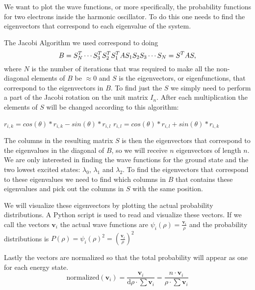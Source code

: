 

We want to plot the wave functions, or more specifically, the
probability functions for two electrons inside the harmonic
oscillator. To do this one needs to find the eigenvectors that
correspond to each eigenvalue of the system.

The Jacobi Algorithm we used correspond to doing
$$ B = S^T_N \cdots S^T_3 \\ S^T_2 \\ S^T_1 \\ A \\ S_1 \\ S_2 \\
S_3 \cdots S_N = S^T A S, $$
where $N$ is the number of iterations that was required to make all
the non-diagonal elements of $B$ be $\approx 0$ and $S$ is the
eigenvectors, or eigenfunctions, that correspond to the
eigenvectors in $B$. To find just the $S$ we simply need to perform
a part of the Jacobi rotation on the unit matrix $I_n$. After each
multiplication the elements of $S$ will be changed according to
this algorithm:
\begin{algorithmic}
        \State$r_{i,k} = cos(\theta) * r_{i,k} - sin(\theta) * r_{i,l}$
		\State$r_{i,l} = cos(\theta) * r_{i,l} + sin(\theta) * r_{i,k}$
    \EndFor
\end{algorithmic}
The columns in the resulting matrix $S$ is then the eigenvectors
that correspond to the eigenvalues in the diagonal of $B$, so we
will receive $n$ eigenvectors of length $n$. We are only interested
in finding the wave functions for the ground state and the two
lowest excited states: $\lambda_0$, $\lambda_1$ and $\lambda_2$. To
find the eigenvectors that correspond to these eigenvalues we need
to find which columns in $B$ that contains these eigenvalues and
pick out the columns in $S$ with the same position.

We will visualize these eigenvectors by plotting the actual
probability distributions. A Python script is used to read and
visualize these vectors. If we call the vectors $\mathbf{v}_i$ the
actual wave functions are $\psi_i(\rho) =
\frac{\mathbf{v}_i}{\rho}$ and the probability distributions is
$P(\rho) = \psi_i(\rho)^2 = ( \frac{\mathbf{v}_i}{\rho} )^2$

Lastly the vectors are normalized so that the total probability
will appear as one for each energy state.
$$
\mathrm{normalized}(\mathbf{v}_i)
= \frac{\mathbf{v}_i}{\mathrm{d}\rho \cdot \sum \mathbf{v}_i }
= \frac{n \cdot \mathbf{v}_i}{\rho \cdot \sum \mathbf{v}_i }
$$

